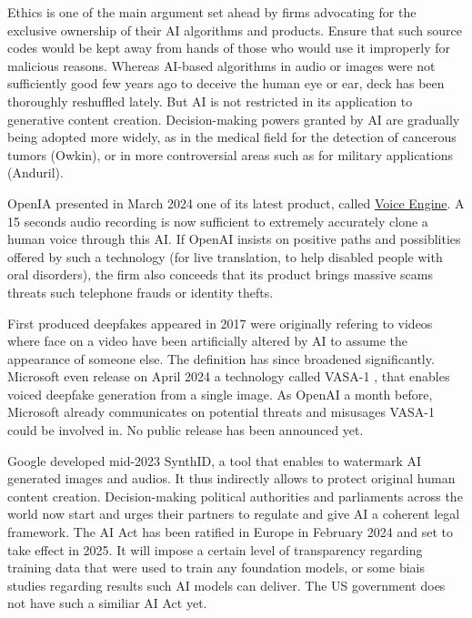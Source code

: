 Ethics is one of the main argument set ahead by firms advocating for the exclusive ownership of their \ac{AI} algorithms and products. Ensure that such source codes would be kept away from hands of those who would use it improperly for malicious reasons. Whereas \ac{AI}-based algorithms in audio or images were not sufficiently good few years ago to deceive the human eye or ear, deck has been thoroughly reshuffled lately. But \ac{AI} is not restricted in its application to generative content creation. Decision-making powers granted by \ac{AI} are gradually being adopted more widely, as in the medical field for the detection of cancerous tumors (Owkin), or in more controversial areas such as for military applications (Anduril).

OpenIA presented in March 2024 one of its latest product, called \href{https://openai.com/blog/navigating-the-challenges-and-opportunities-of-synthetic-voices}{Voice Engine}. A 15 seconds audio recording is now sufficient to extremely accurately clone a human voice through this \ac{AI}. If OpenAI insists on positive paths and possiblities offered by such a technology (for live translation, to help disabled people with oral disorders), the firm also conceeds that its product brings massive scams threats such telephone frauds or identity thefts. 

First produced deepfakes appeared in 2017 were originally refering to videos where face on a video have been artificially altered by AI to assume the appearance of someone else. The definition has since broadened significantly. Microsoft even release on April 2024 a technology called VASA-1 \citep{xu2024vasa1}, that enables voiced deepfake generation from a single image. As OpenAI a month before, Microsoft already communicates on potential threats and misusages VASA-1 could be involved in. No public release has been announced yet. 

Google developed mid-2023 SynthID, a tool that enables to watermark \ac{AI} generated images and audios. It thus indirectly allows to protect original human content creation. Decision-making political authorities and parliaments across the world now start and urges their partners to regulate and give \ac{AI} a coherent legal framework. The AI Act has been ratified in Europe in February 2024 and set to take effect in 2025. It will impose a certain level of transparency regarding training data that were used to train any foundation models, or some biais studies regarding results such \ac{AI} models can deliver. The US government does not have such a similiar AI Act yet. 



